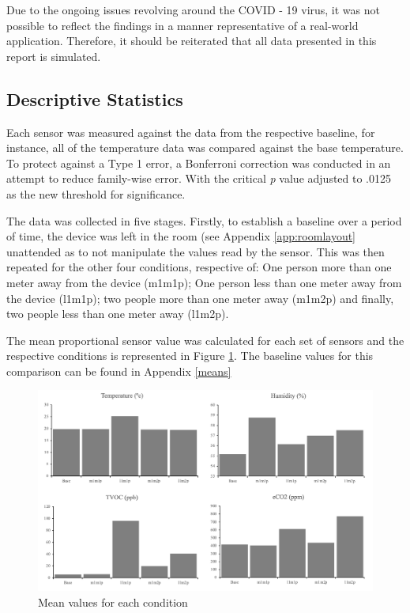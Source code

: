 \documentclass{ueacmpstyle}
\begin{document}
        Due to the ongoing issues revolving around the COVID - 19 virus, it was not possible to reflect the findings in a manner representative of a real-world application. Therefore, it should be reiterated that all data presented in this report is simulated.
        
        \subsection{Descriptive Statistics}
        
        Each sensor was measured against the data from the respective baseline, for instance, all of the temperature data was compared against the base temperature. To protect against a Type 1 error, a Bonferroni correction was conducted in an attempt to reduce family-wise error. With the critical \textit{p} value adjusted to .0125 as the new threshold for significance. 
        
        The data was collected in five stages. Firstly, to establish a baseline over a period of time, the device was left in the room (see Appendix \ref{app:roomlayout} unattended as to not manipulate the values read by the sensor. This was then repeated for the other four conditions, respective of: One person more than one meter away from the device (m1m1p); One person less than one meter away from the device (l1m1p); two people more than one meter away (m1m2p) and finally, two people less than one meter away (l1m2p).
        
        The mean proportional sensor value was calculated for each set of sensors and the respective conditions is represented in Figure \ref{fig:MeanValues}. The baseline values for this comparison can be found in Appendix \ref{means}
        
        \begin{center}
            \begin{figure}
                \centering
                \includegraphics[scale=0.5]{Images/average.png}
                \caption{Mean values for each condition}
                \label{fig:MeanValues}
            \end{figure}
        \end{center}
        
\end{document}
